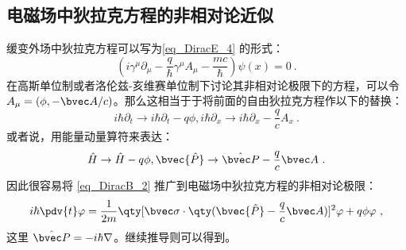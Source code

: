 \subsection{电磁场中狄拉克方程的非相对论近似}
缓变外场中狄拉克方程可以写为\autoref{eq_DiracE_4}  的形式：
\begin{equation}
(i\gamma^\mu \partial_\mu -\frac{q}{\hbar}\gamma^\mu A_\mu - \frac{mc}{\hbar})\psi(x)=0~.
\end{equation}
在高斯单位制或者洛伦兹-亥维赛单位制下讨论其非相对论极限下的方程，可以令 $A_\mu=(\phi,-\bvec A/c)$。那么这相当于于将前面的自由狄拉克方程作以下的替换：
\begin{equation}
i\hbar \partial_t \rightarrow i\hbar\partial_t -q\phi, i\hbar\partial_x\rightarrow i\hbar\partial_x - \frac{q}{c}A_x~.
\end{equation}
或者说，用能量动量算符来表达：
\begin{equation}
\hat H\rightarrow \hat H-q\phi,\bvec{\hat P}\rightarrow \hat {\bvec P}-\frac{q}{c}\bvec A~.
\end{equation}
因此很容易将 \autoref{eq_DiracB_2} 推广到电磁场中狄拉克方程的非相对论极限：
\begin{equation}\label{eq_DiracB_3}
i\hbar\pdv{t} \varphi = \frac{1}{2m}\qty[\bvec \sigma \cdot\qty(\bvec {\hat P} - \frac{q}{c}\bvec A)]^2 \varphi + q\phi  \varphi~,
\end{equation}
这里 $\hat{\bvec P}=-i\hbar\nabla$。继续推导则可以得到。
